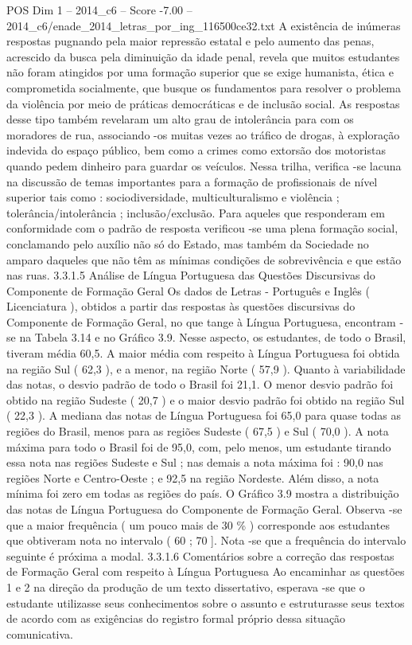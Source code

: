 \begin{textsample}{POS Dim 1 – 2014\_c6 – Score -7.00 – 2014\_c6/enade\_2014\_letras\_por\_ing\_116500ce32.txt}
A existência de inúmeras respostas pugnando pela maior repressão estatal e pelo aumento das penas, acrescido da busca pela diminuição da idade penal, revela que muitos estudantes não foram atingidos por uma formação superior que se exige humanista, ética e comprometida socialmente, que busque os fundamentos para resolver o problema da violência por meio de práticas democráticas e de inclusão social.
As respostas desse tipo também revelaram um alto grau de intolerância para com os moradores de rua, associando -os muitas vezes ao tráfico de drogas, à exploração indevida do espaço público, bem como a crimes como extorsão dos motoristas quando pedem dinheiro para guardar os veículos.
Nessa trilha, verifica -se lacuna na discussão de temas importantes para a formação de profissionais de nível superior tais como : sociodiversidade, multiculturalismo e violência ; tolerância/intolerância ; inclusão/exclusão.
Para aqueles que responderam em conformidade com o padrão de resposta verificou -se uma plena formação social, conclamando pelo auxílio não só do Estado, mas também da Sociedade no amparo daqueles que não têm as mínimas condições de sobrevivência e que estão nas ruas. 3.3.1.5 Análise de Língua Portuguesa das Questões Discursivas do Componente de Formação Geral Os dados de Letras - Português e Inglês ( Licenciatura ), obtidos a partir das respostas às questões discursivas do Componente de Formação Geral, no que tange à Língua Portuguesa, encontram -se na Tabela 3.14 e no Gráfico 3.9.
Nesse aspecto, os estudantes, de todo o Brasil, tiveram média 60,5.
A maior média com respeito à Língua Portuguesa foi obtida na região Sul ( 62,3 ), e a menor, na região Norte ( 57,9 ).
Quanto à variabilidade das notas, o desvio padrão de todo o Brasil foi 21,1.
O menor desvio padrão foi obtido na região Sudeste ( 20,7 ) e o maior desvio padrão foi obtido na região Sul ( 22,3 ).
A mediana das notas de Língua Portuguesa foi 65,0 para quase todas as regiões do Brasil, menos para as regiões Sudeste ( 67,5 ) e Sul ( 70,0 ).
A nota máxima para todo o Brasil foi de 95,0, com, pelo menos, um estudante tirando essa nota nas regiões Sudeste e Sul ; nas demais a nota máxima foi : 90,0 nas regiões Norte e Centro-Oeste ; e 92,5 na região Nordeste.
Além disso, a nota mínima foi zero em todas as regiões do país.
O Gráfico 3.9 mostra a distribuição das notas de Língua Portuguesa do Componente de Formação Geral.
Observa -se que a maior frequência ( um pouco mais de 30 \% ) corresponde aos estudantes que obtiveram nota no intervalo ( 60 ; 70 ].
Nota -se que a frequência do intervalo seguinte é próxima a modal. 3.3.1.6 Comentários sobre a correção das respostas de Formação Geral com respeito à Língua Portuguesa Ao encaminhar as questões 1 e 2 na direção da produção de um texto dissertativo, esperava -se que o estudante utilizasse seus conhecimentos sobre o assunto e estruturasse seus textos de acordo com as exigências do registro formal próprio dessa situação comunicativa.

\end{textsample}
